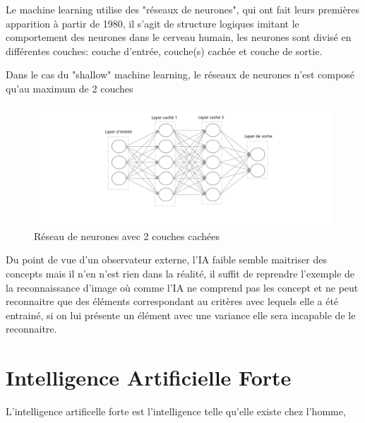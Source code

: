 Le machine learning utilise des "réseaux de neurones", qui ont fait leurs premières 
apparition à partir de 1980, il s'agit de structure logiques imitant 
le comportement des neurones dans le cerveau humain, 
les neurones sont divisé en différentes couches: couche d'entrée, couche(s) cachée
et couche de sortie. 
\newpage

Dans le cas du "shallow" machine learning, le réseaux de neurones n'est composé 
qu'au maximum de 2 couches 

\begin{figure}[!h]
    \centering
    \includegraphics[width=1\textwidth]{Images/feedforward-nn}
    \caption{Réseau de neurones avec 2 couches cachées}
	\label{fig:categorieIA}
\end{figure}

Du point de vue d'un observateur externe, l'IA faible
semble maitriser des concepts mais il n'en n'est rien dans la 
réalité, il suffit de reprendre l'exemple de la reconnaissance d'image
où comme l'IA ne comprend pas les concept et ne peut reconnaitre 
que des éléments correspondant au critères avec lequels elle a été 
entrainé, si on lui présente un élément avec une variance elle 
sera incapable de le reconnaitre.

\newpage
\section{Intelligence Artificielle Forte}
L'intelligence artificelle forte est l'intelligence
telle qu'elle existe chez l'homme, 





